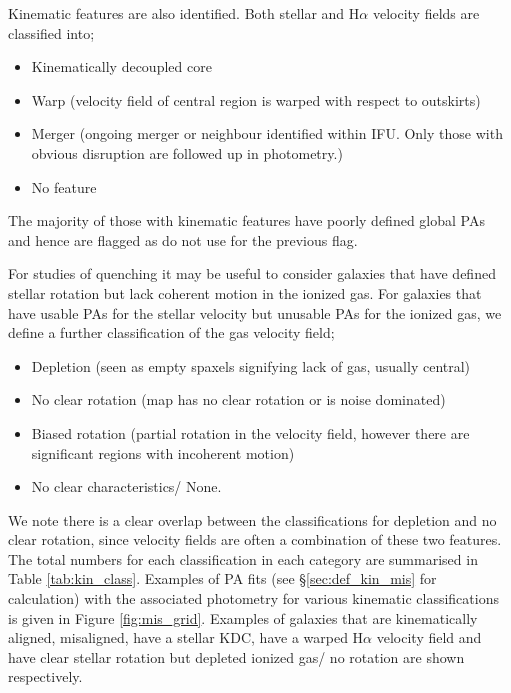 \documentclass[fleqn,usenatbib]{mnras}
\begin{document}
Kinematic features are also identified. Both stellar and H$\alpha$ velocity fields are classified into;
\begin{itemize}
    \item Kinematically decoupled core
    \item Warp (velocity field of central region is warped with respect to outskirts)
    \item Merger (ongoing merger or neighbour identified within IFU. Only those with obvious disruption are followed up in photometry.)
    \item No feature
\end{itemize}
The majority of those with kinematic features have poorly defined global PAs and hence are flagged as do not use for the previous flag. 

For studies of quenching it may be useful to consider galaxies that have defined stellar rotation but lack coherent motion in the ionized gas. For galaxies that have usable PAs for the stellar velocity but unusable PAs for the ionized gas, we define a further classification of the gas velocity field;
\begin{itemize}
    \item Depletion (seen as empty spaxels signifying lack of gas, usually central)
    \item No clear rotation (map has no clear rotation or is noise dominated)
    \item Biased rotation (partial rotation in the velocity field, however there are significant regions with incoherent motion)
    \item No clear characteristics/ None.
\end{itemize}
We note there is a clear overlap between the classifications for depletion and no clear rotation, since velocity fields are often a combination of these two features. The total numbers for each classification in each category are summarised in Table \ref{tab:kin_class}. Examples of PA fits (see \S\ref{sec:def_kin_mis} for calculation) with the associated photometry for various kinematic classifications is given in Figure \ref{fig:mis_grid}. Examples of galaxies that are kinematically aligned, misaligned, have a stellar KDC, have a warped H$\alpha$ velocity field and have clear stellar rotation but depleted ionized gas/ no rotation are shown respectively. 
\end{document}
